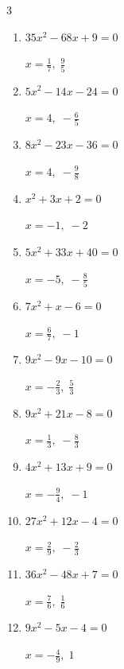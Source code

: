 \begin{multicols}{3}
\begin{enumerate}
        $\displaystyle x=-\frac{9}{8},\; \frac{1}{2}$

  \item $35x^{2}-68x+9=0$

        $\displaystyle x=\frac{1}{7},\; \frac{9}{5}$

\columnbreak %

\resetques

  \item $5x^{2}-14x-24=0$

        $\displaystyle x=4,\; -\frac{6}{5}$

  \item $8x^{2}-23x-36=0$

        $\displaystyle x=4,\; -\frac{9}{8}$

  \item $x^{2}+3x+2=0$

        $\displaystyle x=-1,\; -2$

  \item $5x^{2}+33x+40=0$

        $\displaystyle x=-5,\; -\frac{8}{5}$

  \item $7x^{2}+x-6=0$

        $\displaystyle x=\frac{6}{7},\; -1$

  \item $9x^{2}-9x-10=0$

        $\displaystyle x=-\frac{2}{3},\; \frac{5}{3}$

  \item $9x^{2}+21x-8=0$

        $\displaystyle x=\frac{1}{3},\; -\frac{8}{3}$

  \item $4x^{2}+13x+9=0$

        $\displaystyle x=-\frac{9}{4},\; -1$

  \item $27x^{2}+12x-4=0$

        $\displaystyle x=\frac{2}{9},\; -\frac{2}{3}$

  \item $36x^{2}-48x+7=0$

        $\displaystyle x=\frac{7}{6},\; \frac{1}{6}$

\columnbreak %

  \item $9x^{2}-5x-4=0$

        $\displaystyle x=-\frac{4}{9},\; 1$


\end{enumerate}
\end{multicols}

